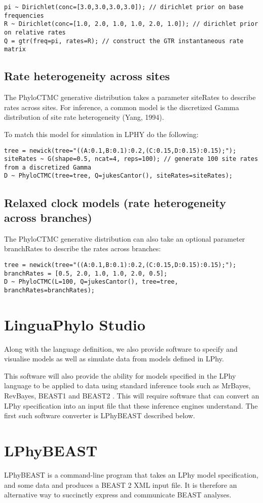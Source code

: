 \documentclass[oneside]{article}
\begin{document}
\begin{verbatim}
pi ~ Dirichlet(conc=[3.0,3.0,3.0,3.0]); // dirichlet prior on base frequencies
R ~ Dirichlet(conc=[1.0, 2.0, 1.0, 1.0, 2.0, 1.0]); // dirichlet prior on relative rates
Q = gtr(freq=pi, rates=R); // construct the GTR instantaneous rate matrix
\end{verbatim}

\subsection{ Rate heterogeneity across sites}

The PhyloCTMC generative distribution takes a parameter siteRates to describe rates across sites.
For inference, a common model is the discretized Gamma distribution of site rate heterogeneity (Yang, 1994).

To match this model for simulation in LPHY do the following:

\begin{verbatim}
tree = newick(tree="((A:0.1,B:0.1):0.2,(C:0.15,D:0.15):0.15);");
siteRates ~ G(shape=0.5, ncat=4, reps=100); // generate 100 site rates from a discretized Gamma
D ~ PhyloCTMC(tree=tree, Q=jukesCantor(), siteRates=siteRates);
\end{verbatim}

\subsection{  Relaxed clock models (rate heterogeneity across branches) }

The PhyloCTMC generative distribution can also take an optional parameter branchRates to describe the
rates across branches:

\begin{verbatim}
tree = newick(tree="((A:0.1,B:0.1):0.2,(C:0.15,D:0.15):0.15);");
branchRates = [0.5, 2.0, 1.0, 1.0, 2.0, 0.5];
D ~ PhyloCTMC(L=100, Q=jukesCantor(), tree=tree, branchRates=branchRates);
\end{verbatim}

\section{LinguaPhylo Studio}

Along with the language definition, we also provide software to
specify and visualise models as well as simulate data from models
defined in LPhy.

This software will also provide the ability for models specified in
the LPhy language to be applied to data using standard inference tools
such as MrBayes, RevBayes, BEAST1 and BEAST2
\cite{bouckaert2014beastanalysis,DrummondBouckaert2015,bouckaert2019beastanalysis}.
This will require software that can convert an LPhy specification into
an input file that these inference engines understand.
The first such software converter is LPhyBEAST described below.

\section{LPhyBEAST}

LPhyBEAST is a command-line program that takes an LPhy model
specification, and some data and produces a BEAST 2 XML input file.
It is therefore an alternative way to succinctly express and
communicate BEAST analyses. 



\end{document}
